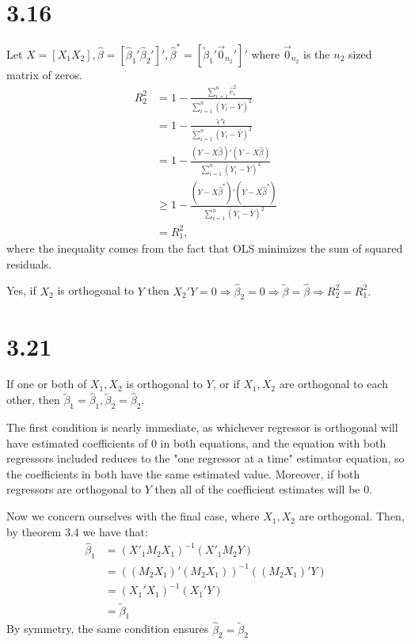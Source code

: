 \documentclass[11pt]{article} %
\begin{document}
\section{3.16}
Let $X = [X_1 X_2], \hat{\beta} = [\hat{\beta}_1' \hat{\beta}_2' ]', \hat{\beta}^{*} = [\tilde{\beta}_1' \vec{0}_{n_2}']'$ where $\vec{0}_{n_2}$ is the $n_2$ sized matrix of zeros.
\begin{align*}
R_2^2 &= 1 - \frac{\sum_{i=1}^n\hat{e}_i^2}{\sum_{i=1}^n (Y_i - \bar{Y})^2}\\
&= 1 - \frac{\hat{\epsilon}'\hat{\epsilon}}{\sum_{i=1}^n (Y_i - \bar{Y})^2}\\
&= 1 - \frac{(Y - X\hat{\beta})'(Y - X\hat{\beta})}{\sum_{i=1}^n (Y_i - \bar{Y})^2}\\
&\geq 1 -  \frac{(Y - X\hat{\beta}^{*})'(Y - X\hat{\beta}^{*})}{\sum_{i=1}^n (Y_i - \bar{Y})^2} \\
&= R_1^2,
\end{align*}
where the inequality comes from the fact that OLS minimizes the sum of squared residuals.

Yes, if $X_2$ is orthogonal to $Y$ then $X_2'Y = 0 \Rightarrow \hat{\beta}_2 = 0 \Rightarrow \tilde{\beta}  = \hat{\beta}  \Rightarrow R^2_2 = R^2_1.$
\section{3.21}

If one or both of $X_1,X_2$ is orthogonal to $Y$, or if $X_1, X_2$ are orthogonal to each other, then $\tilde{\beta}_1 = \hat{\beta}_1, \tilde{\beta}_2 = \hat{\beta}_2.$

The first condition is nearly immediate, as whichever regressor is orthogonal will have estimated coefficients of 0 in both equations, and the equation with both regressors included reduces to the "one regressor at a time" estimator equation, so the coefficients in both have the same estimated value. Moreover, if both regressors are orthogonal to $Y$ then all of the coefficient estimates will be 0.

Now we concern ourselves with the final case, where $X_1,X_2$ are orthogonal. Then, by theorem 3.4 we have that:
\begin{align*}
\hat{\beta}_1 &= (X'_1M_2X_1)^{-1}(X'_1 M_2 Y)\\
 &=  ((M_2X_1)'(M_2X_1))^{-1}((M_2X_1)' Y) \\
&= (X_1'X_1)^{-1}(X_1' Y)\\
&= \tilde{\beta}_1
\end{align*}
By symmetry, the same condition ensures $\hat{\beta}_2 =  \tilde{\beta}_2$
\end{document}
